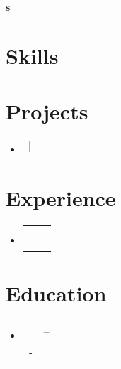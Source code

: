 \documentclass[letterpaper,11pt]{article}
\makeatletter
\newcommand{\resumeSubheading}[4]{
  \vspace{-2pt}\item
    \begin{tabular*}{0.97\textwidth}{l@{\extracolsep{\fill}}r}
      \textbf{#1} & #2 \\
      \textit{#3} & \textit{#4} \\
    \end{tabular*}\vspace{-7pt}
}
\newcommand{\resumeProjectHeading}[2]{
  \item
    \begin{tabular*}{0.97\textwidth}{l@{\extracolsep{\fill}}r}
      {#1} & #2 \\
    \end{tabular*}\vspace{-7pt}
}
\newcommand{\resumeSubHeadingListStart}{\begin{itemize}[leftmargin=0.15in, label={}]}
\newcommand{\resumeSubHeadingListEnd}{\end{itemize}}
\makeatother
\begin{document}
\begin{center}
  \textbf{\Huge \scshape s} \\ \vspace{3pt}
  
  
  
  
\end{center}

\section{Skills}
\begin{itemize}[leftmargin=0.15in, label={}]
  
  
  
  
  
\end{itemize}

\section{Projects}
\resumeSubHeadingListStart

  \resumeProjectHeading
    {\textbf{}  $|$ \emph{}}{}
    

\resumeSubHeadingListEnd

\section{Experience}
\resumeSubHeadingListStart

  \resumeSubheading
    {}{--}
    {}{}
    

\resumeSubHeadingListEnd

\section{Education}
\resumeSubHeadingListStart

  \resumeSubheading
    {}{--}
    {-}{}

\resumeSubHeadingListEnd
\end{document}
